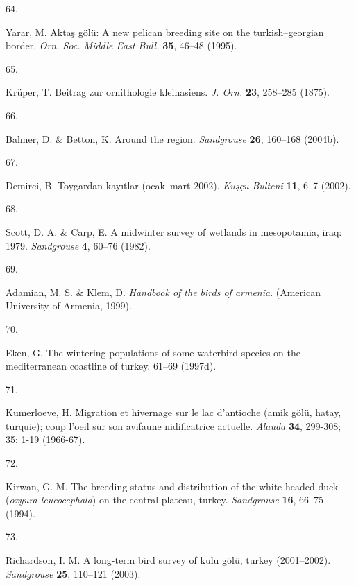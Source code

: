 \documentclass[
  letterpaper,
  DIV=11,
  numbers=noendperiod]{scrreprt}
\newlength{\cslhangindent}
\newlength{\csllabelwidth}
\newlength{\cslentryspacingunit} %
\newenvironment{CSLReferences}[2] %
 {%
  \setlength{\parindent}{0pt}
  \ifodd #1
  \let\oldpar\par
  \def\par{\hangindent=\cslhangindent\oldpar}
  \fi
  \setlength{\parskip}{#2\cslentryspacingunit}
 }%
 {}
\newcommand{\CSLLeftMargin}[1]{\parbox[t]{\csllabelwidth}{#1}}
\newcommand{\CSLRightInline}[1]{\parbox[t]{\linewidth - \csllabelwidth}{#1}\break}
\begin{document}
\begin{CSLReferences}{0}{0}
\leavevmode{}%
\CSLLeftMargin{64. }%
\CSLRightInline{Yarar, M. Aktaş gölü: A new pelican breeding site on the
turkish--georgian border. \emph{Orn. Soc. Middle East Bull.}
\textbf{35}, 46--48 (1995).}

\leavevmode{}%
\CSLLeftMargin{65. }%
\CSLRightInline{Krüper, T. Beitrag zur ornithologie kleinasiens.
\emph{J. Orn.} \textbf{23}, 258--285 (1875).}

\leavevmode{}%
\CSLLeftMargin{66. }%
\CSLRightInline{Balmer, D. \& Betton, K. Around the region.
\emph{Sandgrouse} \textbf{26}, 160--168 (2004b).}

\leavevmode{}%
\CSLLeftMargin{67. }%
\CSLRightInline{Demirci, B. Toygardan kayıtlar (ocak--mart 2002).
\emph{Kuşçu Bulteni} \textbf{11}, 6--7 (2002).}

\leavevmode{}%
\CSLLeftMargin{68. }%
\CSLRightInline{Scott, D. A. \& Carp, E. A midwinter survey of wetlands
in mesopotamia, iraq: 1979. \emph{Sandgrouse} \textbf{4}, 60--76
(1982).}

\leavevmode{}%
\CSLLeftMargin{69. }%
\CSLRightInline{Adamian, M. S. \& Klem, D. \emph{Handbook of the birds
of armenia}. (American University of Armenia, 1999).}

\leavevmode{}%
\CSLLeftMargin{70. }%
\CSLRightInline{Eken, G. The wintering populations of some waterbird
species on the mediterranean coastline of turkey. 61--69 (1997d).}

\leavevmode{}%
\CSLLeftMargin{71. }%
\CSLRightInline{Kumerloeve, H. Migration et hivernage sur le lac
d'antioche (amik gölü, hatay, turquie); coup l'oeil sur son avifaune
nidificatrice actuelle. \emph{Alauda} \textbf{34}, 299-308; 35: 1-19
(1966-67).}

\leavevmode{}%
\CSLLeftMargin{72. }%
\CSLRightInline{Kirwan, G. M. The breeding status and distribution of
the white-headed duck (\emph{oxyura leucocephala}) on the central
plateau, turkey. \emph{Sandgrouse} \textbf{16}, 66--75 (1994).}

\leavevmode{}%
\CSLLeftMargin{73. }%
\CSLRightInline{Richardson, I. M. A long-term bird survey of kulu gölü,
turkey (2001--2002). \emph{Sandgrouse} \textbf{25}, 110--121 (2003).}


\end{CSLReferences}
\end{document}

